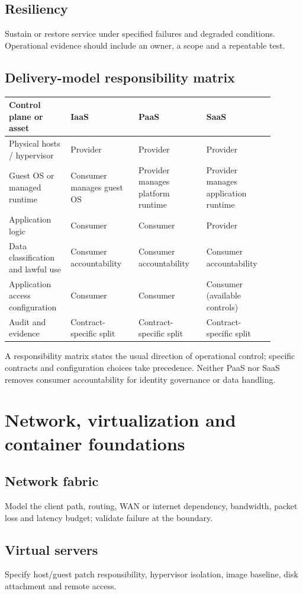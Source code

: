 \documentclass[10pt,letterpaper]{article}
\begin{document}
\subsection{Resiliency}
Sustain or restore service under specified failures and degraded conditions. Operational evidence should include an owner, a scope and a repeatable test.
\subsection{Delivery-model responsibility matrix}
\small\begin{longtable}{p{0.2\linewidth}p{0.23\linewidth}p{0.23\linewidth}p{0.23\linewidth}}
\toprule Control plane or asset & IaaS & PaaS & SaaS \\\midrule
Physical hosts / hypervisor & Provider & Provider & Provider \\
Guest OS or managed runtime & Consumer manages guest OS & Provider manages platform runtime & Provider manages application runtime \\
Application logic & Consumer & Consumer & Provider \\
Data classification and lawful use & Consumer accountability & Consumer accountability & Consumer accountability \\
Application access configuration & Consumer & Consumer & Consumer (available controls) \\
Audit and evidence & Contract-specific split & Contract-specific split & Contract-specific split \\\bottomrule
\end{longtable}\normalsize
A responsibility matrix states the usual direction of operational control; specific contracts and configuration choices take precedence. Neither PaaS nor SaaS removes consumer accountability for identity governance or data handling.
\section{Network, virtualization and container foundations}
\subsection{Network fabric}
Model the client path, routing, WAN or internet dependency, bandwidth, packet loss and latency budget; validate failure at the boundary.
\subsection{Virtual servers}
Specify host/guest patch responsibility, hypervisor isolation, image baseline, disk attachment and remote access.
\end{document}
